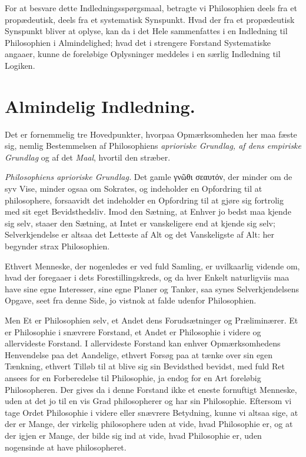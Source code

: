 \documentclass[12pt]{book}
\begin{document}
For at besvare dette Indledningsspørgsmaal, betragte vi Philosophien deels fra
et propædeutisk, deels fra et systematisk Synspunkt. Hvad der fra et
propædeutisk Synspunkt bliver at oplyse, kan da i det Hele sammenfattes i en
Indledning
til Philosophien i Almindelighed; hvad det i strengere Forstand Systematiske
angaaer, kunne de foreløbige Oplysninger meddeles i en særlig Indledning til
Logiken.

\section*{Almindelig Indledning.}

Det er fornemmelig tre Hovedpunkter, hvorpaa Opmærksomheden her maa fæste sig,
nemlig Bestemmelsen af Philosophiens \emph{aprioriske Grundlag, af dens empiriske
Grundlag} og af det \emph{Maal}, hvortil den stræber.

\emph{Philosophiens aprioriske Grundlag.} Det gamle γνῶθι σεαυτόν, der minder
om de syv Vise, minder ogsaa om Sokrates, og indeholder en Opfordring til at
philosophere, forsaavidt det indeholder en Opfordring til at gjøre sig fortrolig
med sit eget Bevidsthedsliv. Imod den Sætning, at Enhver jo bedst maa kjende sig
selv, staaer den Sætning, at Intet er vanskeligere end at kjende sig selv;
Selverkjendelse er altsaa det Letteste af Alt og det Vanskeligste af Alt: her
begynder strax Philosophien.

Ethvert Menneske, der nogenledes er ved fuld Samling, er uvilkaarlig vidende om,
hvad der foregaaer i dets Forestillingskreds, og da hver Enkelt naturligviis maa
have sine egne Interesser, sine egne Planer og Tanker, saa synes
Selverkjendelsens Opgave, seet fra denne Side, jo vistnok at falde udenfor
Philosophien.

Men Et er Philosophien selv, et Andet dens Forudsætninger og Præliminærer. Et er
Philosophie i snævrere Forstand, et Andet er Philosophie i videre og allervideste
Forstand. I allervideste Forstand kan enhver Opmærksomhedens Henvendelse paa det
Aandelige, ethvert Forsøg paa at tænke over sin egen Tænkning, ethvert Tilløb til
at blive sig sin Bevidsthed bevidst, med fuld Ret ansees for en Forberedelse til
Philosophie,
ja endog for en Art foreløbig Philosopheren. Der gives da i denne Forstand ikke
et eneste fornuftigt Menneske, uden at det jo til en vis Grad philosopherer og
har sin Philosophie. Eftersom vi tage Ordet Philosophie i videre eller snævrere
Betydning, kunne vi altsaa sige, at der er Mange, der virkelig philosophere uden
at vide, hvad Philosophie er, og at der igjen er Mange, der bilde sig ind at
vide, hvad Philosophie er, uden nogensinde at have philosopheret.
\end{document}
